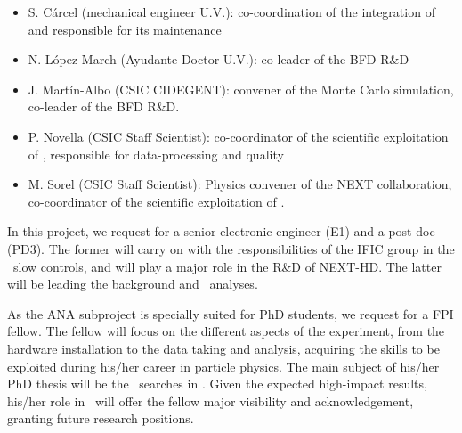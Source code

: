 \begin{itemize}
    \item S. C\'arcel (mechanical engineer U.V.): co-coordination of the integration of \Next and responsible for its maintenance
    \item N. L\'opez-March (Ayudante Doctor U.V.): co-leader of the BFD R\&D
    \item J. Mart\'in-Albo (CSIC CIDEGENT): convener of the Monte Carlo simulation, co-leader of the BFD R\&D. 
    \item P. Novella (CSIC Staff Scientist): co-coordinator of the scientific exploitation of \Next, responsible for data-processing and quality
    \item M. Sorel (CSIC Staff Scientist): Physics convener of the NEXT collaboration, co-coordinator of the scientific exploitation of \Next.
\end{itemize}


In this project, we request for a senior electronic engineer (E1) and a post-doc (PD3). The former will carry on with the responsibilities of the IFIC group in the \Next\ slow controls, and will play a major role in the R\&D of NEXT-HD. The latter will be leading the background and \bb\ analyses.   

As the ANA subproject is specially suited for PhD students, we request for a FPI fellow.  The fellow will focus on the different aspects of the experiment, from the hardware installation to the data taking and analysis, acquiring the skills to be exploited during his/her career in particle physics. The main subject of his/her PhD thesis will be the \bb\ searches in \Next. Given the expected high-impact results, his/her role in \Next\ will
offer the fellow major visibility and acknowledgement, granting future research positions.


